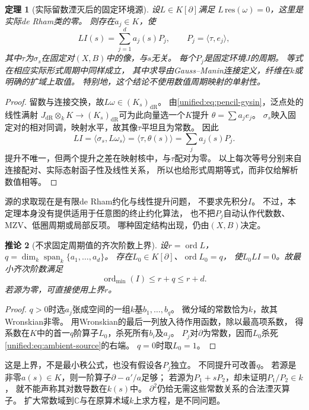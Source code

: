 \documentclass[11pt,a4paper,oneside]{ctexart}
\theoremstyle{cnplain}
\newtheorem{theorem}{定理}[section]
\newtheorem{corollary}[theorem]{推论}
\theoremstyle{definition}
\theoremstyle{remark}
\newcommand{\dR}{\mathrm{dR}}
\numberwithin{equation}{section}
\begin{document}
\begin{theorem}[实际留数湮灭后的固定环境源]\label{unified:thm:ambient-source}
设$L\in K[\partial]$满足
$L\,\mathrm{res}(\omega)=0$，这里是实际de Rham类的零。
则存在$a_j\in K$，使
\begin{equation}\label{unified:eq:ambient-source}
 L I(s)=\sum_{j=1}^d a_j(s)P_j,\qquad
 P_j=\langle\tau,e_j\rangle,
\end{equation}
其中$\tau$为$\sigma_s$在固定对$(X,B)$中的像，与$s$无关。
每个$P_j$是固定环境$J$的周期。
等式在相应实际形式周期中同样成立，
其中求导由Gauss--Manin连接定义，纤维在$k$或明确的扩域上取值。
特别地，这个结论不使用数值周期映射的单射性。
\end{theorem}
\begin{proof}
留数与连接交换，故$L\omega\in(K_s)_{\dR}$。
由\eqref{unified:eq:pencil-gysin}，泛点处的线性满射
$J_{\dR}\otimes_k K\to(K_s)_{\dR}$可为此向量选一个$K$提升
$\theta=\sum a_je_j$。
$\sigma_s$映入固定对的相对同调，映射水平，故其像$\tau$平坦且为常数。
因此
\[
 LI=\langle\sigma_s,L\omega_s\rangle
   =\langle\tau,\theta(s)\rangle=\sum_j a_j(s)P_j.
\]
提升不唯一，但两个提升之差在映射核中，与$\tau$配对为零。
以上每次等号分别来自连接配对、实际态射函子性及线性关系，
所以也给形式周期等式，而非仅给解析数值相等。
\end{proof}

源的求取现在是有限de Rham约化与线性提升问题，
不要求先积分$I$。
不过，本定理本身没有提供适用于任意图的终止约化算法，
也不把$P_j$自动认作代数数、MZV、低圈周期或局部反项。
哪种固定结构出现，仍由$(X,B)$决定。

\begin{corollary}[不求固定周期值的齐次阶数上界]\label{unified:cor:ambient-order}
设$r=\operatorname{ord}L$，
$q=\dim_k\operatorname{span}_k\{a_1,\ldots,a_d\}$。
存在$L_0\in K[\partial]$、$\operatorname{ord}L_0=q$，
使$L_0LI=0$。故最小齐次阶数满足
\[
 \operatorname{ord}_{\min}(I)\le r+q\le r+d.
\]
若源为零，可直接使用上界$r$。
\end{corollary}
\begin{proof}
$q>0$时选$a_j$张成空间的一组$k$基$b_1,\ldots,b_q$。
微分域的常数恰为$k$，故其Wronskian非零。
用Wronskian的最后一列放入待作用函数，除以最高项系数，
得系数在$K$中的首一$q$阶算子$L_0$，杀死所有$b_i$及$a_j$。
$P_j$对$\partial$为常数，因而$L_0$杀死\eqref{unified:eq:ambient-source}的右端。
$q=0$时取$L_0=1$。
\end{proof}

这是上界，不是最小秩公式，也没有假设各$P_j$独立。
不同提升可改善$q$。
若源是非零$a(s)\in K$，则一阶算子$\partial-a'/a$足够；
若源为$P_1+sP_2$，却未证明$P_1/P_2\in k$，
就不能声称其对数导数在$k(s)$中。
$\partial^2$仍给无需这些常数关系的合法湮灭算子。
扩大常数域到$\mathbb C$与在原算术域$k$上求方程，是不同问题。
\end{document}
